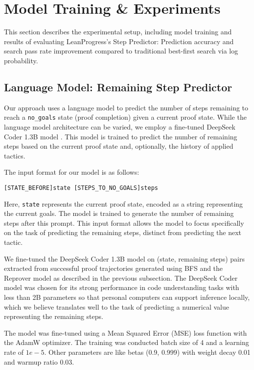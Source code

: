 \section{Model Training \& Experiments}
\label{sec:experiments}

This section describes the experimental setup, including model training and results of evaluating LeanProgress's Step Predictor: Prediction accuracy and search pass rate improvement compared to traditional best-first search via log probability.

\subsection{Language Model: Remaining Step Predictor}

Our approach uses a language model to predict the number of steps remaining to reach a \texttt{no\_goals} state (proof completion) given a current proof state. While the language model architecture can be varied, we employ a fine-tuned DeepSeek Coder 1.3B model \citep{DeepSeek-coder}. This model is trained to predict the number of remaining steps based on the current proof state and, optionally, the history of applied tactics.

The input format for our model is as follows: 

\texttt{[STATE\_BEFORE]state [STEPS\_TO\_NO\_GOALS]steps}

Here, \texttt{state} represents the current proof state, encoded as a string representing the current goals. The model is trained to generate the number of remaining steps after this prompt. This input format allows the model to focus specifically on the task of predicting the remaining steps, distinct from predicting the next tactic.

We fine-tuned the DeepSeek Coder 1.3B model on (state, remaining steps) pairs extracted from successful proof trajectories generated using BFS and the Reprover model as described in the previous subsection. The DeepSeek Coder model was chosen for its strong performance in code understanding tasks with less than 2B parameters so that personal computers can support inference locally, which we believe translates well to the task of predicting a numerical value representing the remaining steps.

The model was fine-tuned using a Mean Squared Error (MSE) loss function with the AdamW optimizer. The training was conducted batch size of 4 and a learning rate of $1e-5$. Other parameters are like betas (0.9, 0.999) with weight decay 0.01 and warmup ratio 0.03.

